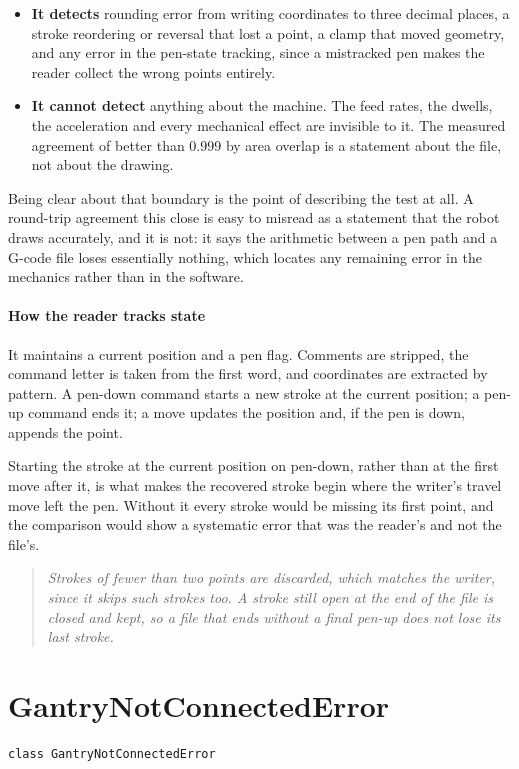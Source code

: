\begin{itemize}\setlength\itemsep{0pt}
  \item \textbf{It detects} rounding error from writing coordinates to three decimal places, a stroke reordering or reversal that lost a point, a clamp that moved geometry, and any error in the pen-state tracking, since a mistracked pen makes the reader collect the wrong points entirely.
  \item \textbf{It cannot detect} anything about the machine. The feed rates, the dwells, the acceleration and every mechanical effect are invisible to it. The measured agreement of better than 0.999 by area overlap is a statement about the file, not about the drawing.
\end{itemize}
Being clear about that boundary is the point of describing the test at all. A round-trip agreement this close is easy to misread as a statement that the robot draws accurately, and it is not: it says the arithmetic between a pen path and a G-code file loses essentially nothing, which locates any remaining error in the mechanics rather than in the software.


\paragraph{How the reader tracks state}
It maintains a current position and a pen flag. Comments are stripped, the command letter is taken from the first word, and coordinates are extracted by pattern. A pen-down command starts a new stroke at the current position; a pen-up command ends it; a move updates the position and, if the pen is down, appends the point.

Starting the stroke at the current position on pen-down, rather than at the first move after it, is what makes the recovered stroke begin where the writer's travel move left the pen. Without it every stroke would be missing its first point, and the comparison would show a systematic error that was the reader's and not the file's.


\begin{quote}\small\itshape Strokes of fewer than two points are discarded, which matches the writer, since it skips such strokes too. A stroke still open at the end of the file is closed and kept, so a file that ends without a final pen-up does not lose its last stroke.\end{quote}

\section{GantryNotConnectedError}
\begin{lstlisting}[style=sig]
class GantryNotConnectedError
\end{lstlisting}

